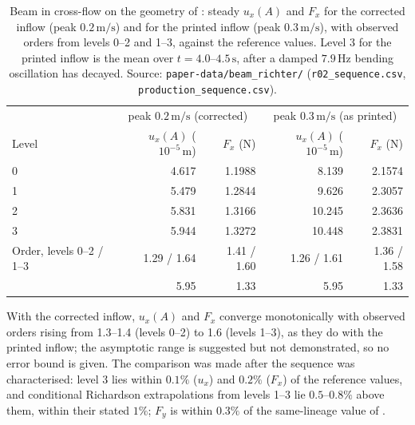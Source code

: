 \documentclass[sn-mathphys,Numbered]{sn-jnl}%
\begin{document}
\begin{appendices}
\begin{table}[htbp]
	\centering
	\footnotesize
	\caption{Beam in cross-flow on the geometry of \citet{Richter2012}: steady $u_x(A)$ and $F_x$ for the corrected inflow (peak $0.2\,\mathrm{m/s}$) and for the printed inflow (peak $0.3\,\mathrm{m/s}$), with observed orders from levels 0--2 and 1--3, against the reference values. Level 3 for the printed inflow is the mean over $t = 4.0$--$4.5\,\mathrm{s}$, after a damped $7.9\,\mathrm{Hz}$ bending oscillation has decayed. Source: \texttt{paper-data/beam\_richter/} (\texttt{r02\_sequence.csv}, \texttt{production\_sequence.csv}).}
	\label{tab:beam_seq}
	\begin{tabular}{lrrrr}
		\toprule
		& \multicolumn{2}{c}{peak $0.2\,\mathrm{m/s}$ (corrected)} & \multicolumn{2}{c}{peak $0.3\,\mathrm{m/s}$ (as printed)} \\
		Level & $u_x(A)$ ($10^{-5}\,\mathrm{m}$) & $F_x$ (N) & $u_x(A)$ ($10^{-5}\,\mathrm{m}$) & $F_x$ (N) \\
		\midrule
		0 & 4.617 & 1.1988 & 8.139 & 2.1574 \\
		1 & 5.479 & 1.2844 & 9.626 & 2.3057 \\
		2 & 5.831 & 1.3166 & 10.245 & 2.3636 \\
		3 & 5.944 & 1.3272 & 10.448 & 2.3831 \\
		\midrule
		Order, levels 0--2 / 1--3 & 1.29 / 1.64 & 1.41 / 1.60 & 1.26 / 1.61 & 1.36 / 1.58 \\
		\citet{Richter2012} & 5.95 & 1.33 & 5.95 & 1.33 \\
		\bottomrule
	\end{tabular}
\end{table}

With the corrected inflow, $u_x(A)$ and $F_x$ converge monotonically with observed orders rising from 1.3--1.4 (levels 0--2) to 1.6 (levels 1--3), as they do with the printed inflow; the asymptotic range is suggested but not demonstrated, so no error bound is given.
The comparison was made after the sequence was characterised: level 3 lies within $0.1\%$ ($u_x$) and $0.2\%$ ($F_x$) of the reference values, and conditional Richardson extrapolations from levels 1--3 lie $0.5$--$0.8\%$ above them, within their stated $1\%$; $F_y$ is within $0.3\%$ of the same-lineage value of \citet{Tukovic2018}.


\end{appendices}
\end{document}
